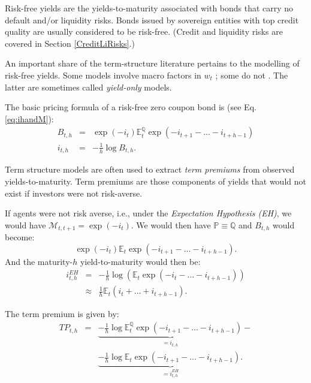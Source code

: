 \documentclass[
  12pt,
]{book}
\theoremstyle{definition}
\theoremstyle{definition}
\theoremstyle{definition}
\theoremstyle{definition}
\theoremstyle{remark}
\begin{document}
Risk-free yields are the yields-to-maturity associated with bonds that carry no default and/or liquidity risks. Bonds issued by sovereign entities with top credit quality are usually considered to be risk-free. (Credit and liquidity risks are covered in Section \ref{CreditLiRisks}.)

An important share of the term-structure literature pertains to the modelling of risk-free yields. Some models involve macro factors in \(w_t\) \citep{Ang_Piazzesi_2003}; some do not \citep{Duffie_Singleton_1997}. The latter are sometimes called \emph{yield-only} models.

The basic pricing formula of a risk-free zero coupon bond is (see Eq. \eqref{eq:ihandM}):
\begin{eqnarray}
B_{t,h} &=& \exp(-i_{t}) \mathbb{E}^{\mathbb{Q}}_t \exp(-i_{t+1}-\dots-i_{t+h-1})\\
i_{t,h} &=& - \frac{1}{h} \log B_{t,h}. \label{eq:stdbondRFchapter}
\end{eqnarray}

Term structure models are often used to extract \emph{term premiums} from observed yields-to-maturity. Term premiums are those components of yields that would not exist if investors were not risk-averse.

If agents were not risk averse, i.e., under the \emph{Expectation Hypothesis (EH)}, we would have \(\mathcal{M}_{t,t+1} = \exp(- i_t)\). We would then have \(\mathbb{P} \equiv \mathbb{Q}\) and \(B_{t,h}\) would become:
\begin{equation}
\exp(-i_{t}) \mathbb{E}_t \exp(-i_{t+1}-\dots-i_{t+h-1}).\label{eq:stdbondRFchapterP}
\end{equation}
And the maturity-\(h\) yield-to-maturity would then be:
\begin{eqnarray}
i^{EH}_{t,h} &=& -\frac{1}{h}\log \left( \mathbb{E}_t \exp(-i_t-\dots-i_{t+h-1})\right)\nonumber\\
&\approx& \frac{1}{h}\mathbb{E}_t(i_t + \dots + i_{t+h-1}).\label{eq:REH}
\end{eqnarray}

The term premium is given by:
\begin{eqnarray}
TP_{t,h} &=& \underbrace{- \frac{1}{h} \log  \mathbb{E}^{\mathbb{Q}}_t \exp(-i_{t+1}-\dots-i_{t+h-1})}_{=i_{t,h}} - \nonumber \\
&& \underbrace{- \frac{1}{h}  \log  \mathbb{E}_t \exp(-i_{t+1}-\dots-i_{t+h-1}).}_{=i^{EH}_{t,h}}\label{eq:TP}
\end{eqnarray}
\end{document}
